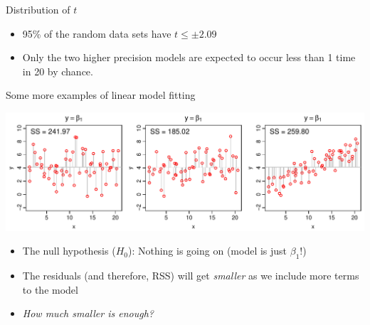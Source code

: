 \documentclass[xcolor=x11names,compress]{beamer}
\renewcommand{\(}{\begin{columns}}
\renewcommand{\)}{\end{columns}}
\newcommand{\<}[1]{\begin{column}{#1}}
\renewcommand{\>}{\end{column}}
\begin{document}

\begin{frame}{Distribution of $t$}


\centerline{}

\pause 
\begin{itemize}[<+->] \itemsep6pt
    \item 95\% of the random data sets have $t\le \pm 2.09$
    \item Only the two higher precision models are expected to occur less than 1 time in 20 by chance.
\end{itemize}

\end{frame}


\begin{frame}{Some more examples of linear model fitting}

\includegraphics[width=\textwidth]{ANOVA_null.pdf}

\begin{itemize}[<+->]\itemsep6pt
\item The null hypothesis ($H_0$): Nothing is going on (model is just $\beta_1$!)
\item The residuals (and therefore, RSS) will get {\it smaller} as we include more terms to the model
\item {\it How much smaller is enough?}
\end{itemize}

\end{frame}

\end{document}
